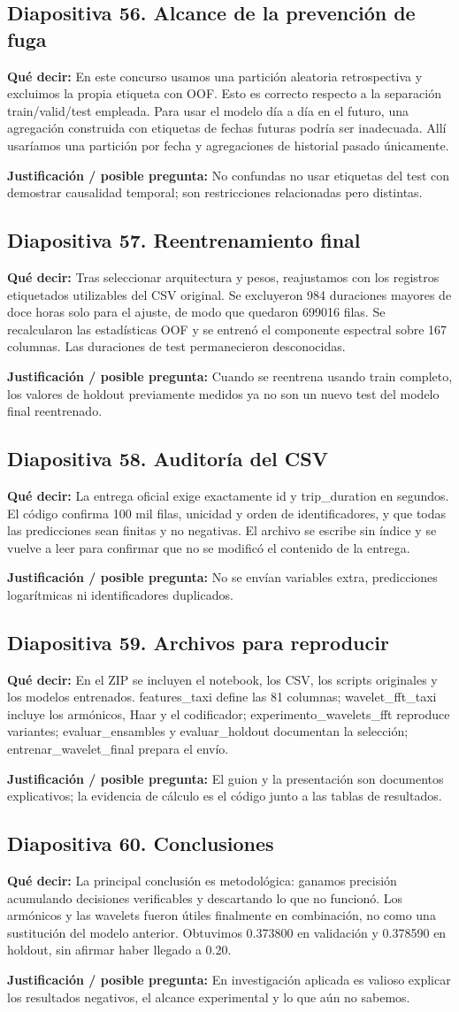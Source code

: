 \documentclass[11pt,letterpaper]{article}
\newcommand{\lamina}[2]{\subsection*{Diapositiva #1. #2}}
\newcommand{\explica}[1]{\noindent\textcolor{azul}{\textbf{Qué decir:}} #1\par\smallskip}
\newcommand{\defiende}[1]{\noindent\textcolor{verde}{\textbf{Justificación / posible pregunta:}} #1\par\medskip}
\begin{document}
\lamina{56}{Alcance de la prevención de fuga}
\explica{En este concurso usamos una partición aleatoria retrospectiva y excluimos la propia etiqueta con OOF. Esto es correcto respecto a la separación train/valid/test empleada. Para usar el modelo día a día en el futuro, una agregación construida con etiquetas de fechas futuras podría ser inadecuada. Allí usaríamos una partición por fecha y agregaciones de historial pasado únicamente.}
\defiende{No confundas no usar etiquetas del test con demostrar causalidad temporal; son restricciones relacionadas pero distintas.}

\lamina{57}{Reentrenamiento final}
\explica{Tras seleccionar arquitectura y pesos, reajustamos con los registros etiquetados utilizables del CSV original. Se excluyeron 984 duraciones mayores de doce horas solo para el ajuste, de modo que quedaron 699016 filas. Se recalcularon las estadísticas OOF y se entrenó el componente espectral sobre 167 columnas. Las duraciones de test permanecieron desconocidas.}
\defiende{Cuando se reentrena usando train completo, los valores de holdout previamente medidos ya no son un nuevo test del modelo final reentrenado.}

\lamina{58}{Auditoría del CSV}
\explica{La entrega oficial exige exactamente id y trip\_duration en segundos. El código confirma 100 mil filas, unicidad y orden de identificadores, y que todas las predicciones sean finitas y no negativas. El archivo se escribe sin índice y se vuelve a leer para confirmar que no se modificó el contenido de la entrega.}
\defiende{No se envían variables extra, predicciones logarítmicas ni identificadores duplicados.}

\lamina{59}{Archivos para reproducir}
\explica{En el ZIP se incluyen el notebook, los CSV, los scripts originales y los modelos entrenados. features\_taxi define las 81 columnas; wavelet\_fft\_taxi incluye los armónicos, Haar y el codificador; experimento\_wavelets\_fft reproduce variantes; evaluar\_ensambles y evaluar\_holdout documentan la selección; entrenar\_wavelet\_final prepara el envío.}
\defiende{El guion y la presentación son documentos explicativos; la evidencia de cálculo es el código junto a las tablas de resultados.}

\lamina{60}{Conclusiones}
\explica{La principal conclusión es metodológica: ganamos precisión acumulando decisiones verificables y descartando lo que no funcionó. Los armónicos y las wavelets fueron útiles finalmente en combinación, no como una sustitución del modelo anterior. Obtuvimos 0.373800 en validación y 0.378590 en holdout, sin afirmar haber llegado a 0.20.}
\defiende{En investigación aplicada es valioso explicar los resultados negativos, el alcance experimental y lo que aún no sabemos.}
\end{document}
